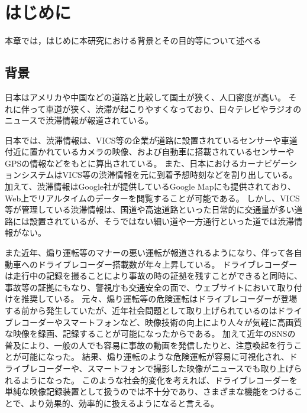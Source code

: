 \chapter{はじめに}
本章では，はじめに本研究における背景とその目的等について述べる
\section{背景}
日本はアメリカや中国などの道路と比較して国土が狭く、人口密度が高い。
それに伴って車道が狭く、渋滞が起こりやすくなっており、日々テレビやラジオのニュースで渋滞情報が報道されている。


日本では、渋滞情報は、VICS等の企業が道路に設置されているセンサーや車道付近に置かれているカメラの映像、および自動車に搭載されているセンサーやGPSの情報などをもとに算出されている。
また、日本におけるカーナビゲーションシステムはVICS等の渋滞情報を元に到着予想時刻などを割り出している。
加えて、渋滞情報はGoogle社が提供しているGoogle Mapにも提供されており、Web上でリアルタイムのデーターを閲覧することが可能である。
しかし、VICS等が管理している渋滞情報は、国道や高速道路といった日常的に交通量が多い道路には設置されているが、そうではない細い道や一方通行といった道では渋滞情報がない。

また近年、煽り運転等のマナーの悪い運転が報道されるようになり、伴って各自動車へのドライブレコーダー搭載数が年々上昇している。
ドライブレコーダーは走行中の記録を撮ることにより事故の時の証拠を残すことができると同時に、事故等の証拠にもなり、警視庁も交通安全の面で、ウェブサイトにおいて取り付けを推奨している。
元々、煽り運転等の危険運転はドライブレコーダーが登場する前から発生していたが、近年社会問題として取り上げられているのはドライブレコーダーやスマートフォンなど、映像技術の向上により人々が気軽に高画質な映像を録画、記録することが可能になったからである。
加えて近年のSNSの普及により、一般の人でも容易に事故の動画を発信したりと、注意喚起を行うことが可能になった。
結果、煽り運転のような危険運転が容易に可視化され、ドライブレコーダーや、スマートフォンで撮影した映像がニュースでも取り上げられるようになった。
このような社会的変化を考えれば、ドライブレコーダーを単純な映像記録装置として扱うのでは不十分であり、さまざまな機能をつけることで、より効果的、効率的に扱えるようになると言える。

